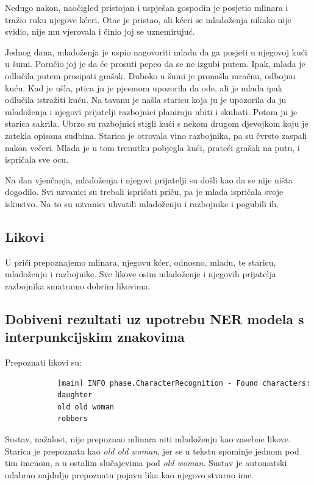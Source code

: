 \documentclass[a4paper,twoside,12pt]{memoir} %
\newcommand{\ti}[1]{\textit{#1\/}}
\begin{document}
		Nedugo nakon, naočigled pristojan i uspješan gospodin je posjetio mlinara i tražio ruku njegove kćeri. Otac je pristao, ali kćeri se mladoženja nikako nije svidio, nije mu vjerovala i činio joj se uznemirujuć.

		Jednog dana, mladoženja je uspio nagovoriti mladu da ga posjeti u njegovoj kući u šumi. Poručio joj je da će prosuti pepeo da se ne izgubi putem. Ipak, mlada je odlučila putem prosipati grašak. Duboko u šumi je pronašla mračnu, odbojnu kuću. Kad je ušla, ptica ju je pjesmom upozorila da ode, ali je mlada ipak odlučila istražiti kuću. Na tavanu je našla staricu koja ju je upozorila da ju mladoženja i njegovi prijatelji razbojnici planiraju ubiti i skuhati. Potom ju je starica sakrila. Ubrzo su razbojnici stigli kući s nekom drugom djevojkom koju je zatekla opisana sudbina. Starica je otrovala vino razbojnika, pa su čvrsto zaspali nakon večeri. Mlada je u tom trenutku pobjegla kući, prateći grašak na putu, i ispričala sve ocu.

		Na dan vjenčanja, mladoženja i njegovi prijatelji su došli kao da se nije ništa dogodilo. Svi uzvanici su trebali ispričati priču, pa je mlada ispričala svoje iskustvo. Na to su uzvanici uhvatili mladoženju i razbojnike i pogubili ih.

		\subsection{Likovi}

		U priči prepoznajemo mlinara, njegovu kćer, odnosno, mladu, te staricu, mla\-do\-že\-nju i razbojnike. Sve likove osim mladoženje i njegovih prijatelja razbojnika smatramo dobrim likovima.


		\subsection{Dobiveni rezultati uz upotrebu NER modela s interpunkcijskim znakovima}

		Prepoznati likovi su:

		\begin{verbatim}
			[main] INFO phase.CharacterRecognition - Found characters:
			daughter
			old old woman
			robbers
		\end{verbatim}

		Sustav, nažalost, nije prepoznao mlinara niti mladoženju kao zasebne likove. Starica je prepoznata kao \ti{old old woman}, jer se u tekstu spominje jednom pod tim imenom, a u ostalim slučajevima pod \ti{old woman}. Sustav je automatski odabrao najdulju prepoznatu pojavu lika kao njegovo stvarno ime.
\end{document}
